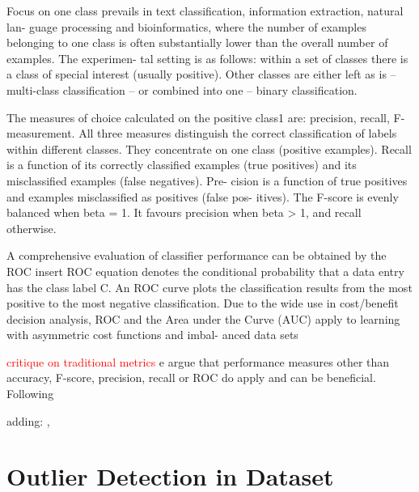 Focus on one class prevails in text classification, information extraction, natural lan-
guage processing and bioinformatics, where the number of examples belonging to one
class is often substantially lower than the overall number of examples. The experimen-
tal setting is as follows: within a set of classes there is a class of special interest (usually
positive). Other classes are either left as is – multi-class classification – or combined into
one – binary classification.

The measures of choice calculated on the positive class1 are: precision, recall, F-measurement.
All three measures distinguish the correct classification of labels within different classes.
They concentrate on one class (positive examples). Recall is a function of its correctly
classified examples (true positives) and its misclassified examples (false negatives). Pre-
cision is a function of true positives and examples misclassified as positives (false pos-
itives). The F-score is evenly balanced when beta = 1. It favours precision when beta > 1,
and recall otherwise.

A comprehensive evaluation of classifier performance can be obtained by the ROC 
insert ROC equation 
denotes the conditional probability that a data entry has the class label C. An
ROC curve plots the classification results from the most positive to the most negative
classification. Due to the wide use in cost/benefit decision analysis, ROC and the Area
under the Curve (AUC) apply to learning with asymmetric cost functions and imbal-
anced data sets

\textcolor{red}{critique on traditional metrics}
e argue that performance measures other than accuracy, F-score, precision, recall or
ROC do apply and can be beneficial. 
Following \citep[p.1017]{sokolova2006beyond}

adding: \citep[p.5]{hilal2022financial}
,
\section{Outlier Detection in Dataset}